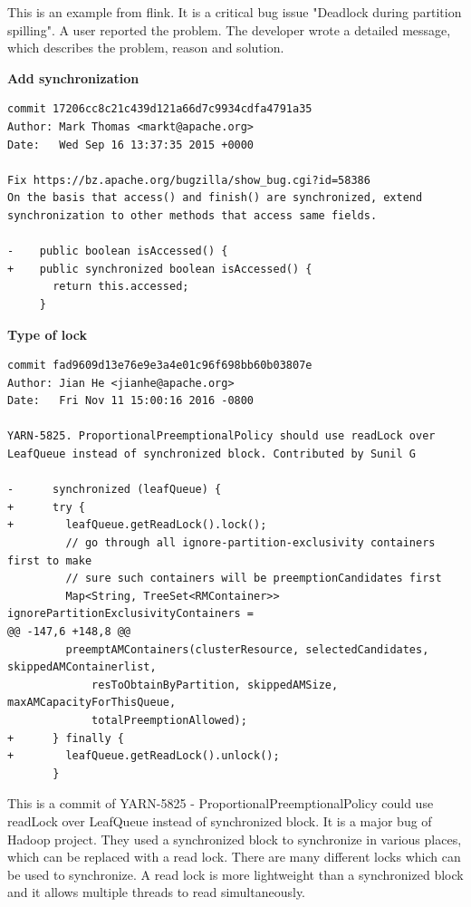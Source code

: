 \documentclass[conference]{IEEEtran}
\begin{document}
This is an example from flink. It is a critical bug issue "Deadlock during partition spilling". A user reported the problem. The developer wrote a detailed message, which describes the problem, reason and solution.

\textbf{Add synchronization}
\begin{lstlisting}
commit 17206cc8c21c439d121a66d7c9934cdfa4791a35
Author: Mark Thomas <markt@apache.org>
Date:   Wed Sep 16 13:37:35 2015 +0000

Fix https://bz.apache.org/bugzilla/show_bug.cgi?id=58386
On the basis that access() and finish() are synchronized, extend synchronization to other methods that access same fields.

-    public boolean isAccessed() {
+    public synchronized boolean isAccessed() {
       return this.accessed;
     }
\end{lstlisting}

\textbf{Type of lock}
\begin{lstlisting}
commit fad9609d13e76e9e3a4e01c96f698bb60b03807e
Author: Jian He <jianhe@apache.org>
Date:   Fri Nov 11 15:00:16 2016 -0800

YARN-5825. ProportionalPreemptionalPolicy should use readLock over LeafQueue instead of synchronized block. Contributed by Sunil G

-      synchronized (leafQueue) {
+      try {
+        leafQueue.getReadLock().lock();
         // go through all ignore-partition-exclusivity containers first to make
         // sure such containers will be preemptionCandidates first
         Map<String, TreeSet<RMContainer>> ignorePartitionExclusivityContainers =
@@ -147,6 +148,8 @@
         preemptAMContainers(clusterResource, selectedCandidates, skippedAMContainerlist,
             resToObtainByPartition, skippedAMSize, maxAMCapacityForThisQueue,
             totalPreemptionAllowed);
+      } finally {
+        leafQueue.getReadLock().unlock();
       }
\end{lstlisting}

This is a commit of YARN-5825 - ProportionalPreemptionalPolicy could use readLock over LeafQueue instead of synchronized block. It is a major bug of Hadoop project. They used a synchronized block to synchronize in various places, which can be replaced with a read lock. There are many different locks which can be used to synchronize. A read lock is more lightweight than a synchronized block and it allows multiple threads to read simultaneously.
\end{document}
